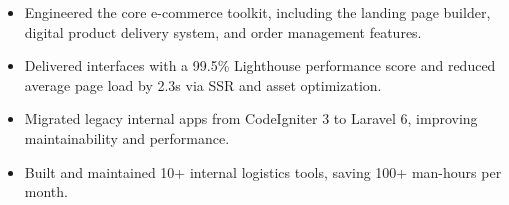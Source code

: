 \begin{itemize}[leftmargin=*, topsep=0pt]
    \item Engineered the core e-commerce toolkit, including the landing page builder, digital product delivery system, and order management features.
    \item Delivered interfaces with a 99.5\% Lighthouse performance score and reduced average page load by 2.3s via SSR and asset optimization.
\end{itemize}
\vspace{0.5em}
\begin{itemize}[leftmargin=*, topsep=0pt]
    \item Migrated legacy internal apps from CodeIgniter 3 to Laravel 6, improving maintainability and performance.
    \item Built and maintained 10+ internal logistics tools, saving 100+ man-hours per month.
\end{itemize}
